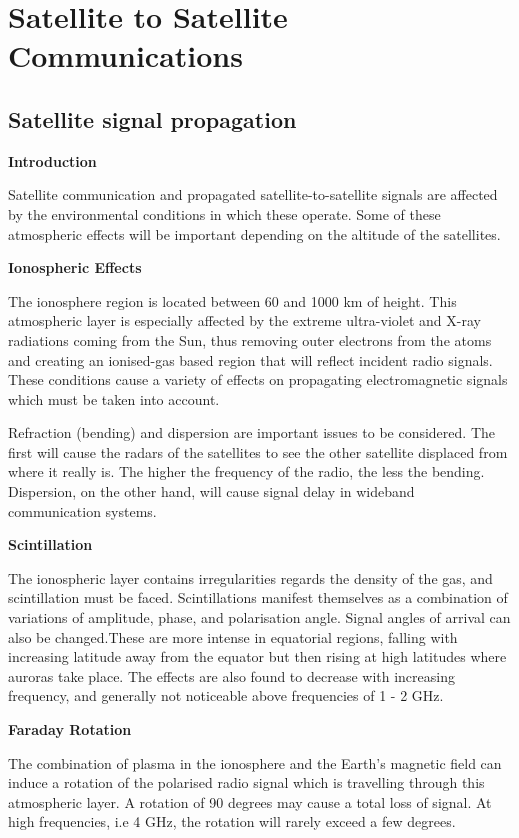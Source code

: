 \documentclass[12pt, titlepage]{article}
\begin{document}
\section{Satellite to Satellite Communications}


\subsection{Satellite signal propagation}

\textbf{Introduction}\newline

Satellite communication and propagated satellite-to-satellite signals are affected by the environmental conditions in which these operate. Some of these atmospheric effects will be important depending on the altitude of the satellites. \newline

\textbf{Ionospheric Effects}\newline

The ionosphere region is located between 60 and 1000 km of height. This atmospheric layer is especially affected by the extreme ultra-violet and X-ray radiations coming from the Sun, thus removing outer electrons from the atoms and creating an ionised-gas based region that will reflect incident radio signals. These conditions cause a variety of effects on propagating electromagnetic signals which must be taken into account. \newline

Refraction (bending) and dispersion are important issues to be considered. The first will cause the radars of the satellites to see the other satellite displaced from where it really is. The higher the frequency of the radio, the less the bending. Dispersion, on the other hand, will cause signal delay in wideband communication systems. \newline

\textbf{Scintillation}\newline

The ionospheric layer contains irregularities regards the density of the gas, and scintillation must be faced. Scintillations manifest themselves as a combination of variations of amplitude, phase, and polarisation angle. Signal angles of arrival can also be changed.These are more intense in equatorial regions, falling with increasing latitude away from the equator but then rising at high latitudes where auroras take place. The effects are also found to decrease with increasing frequency, and generally not noticeable above frequencies of 1 - 2 GHz.\newline

\textbf{Faraday Rotation}\newline

The combination of plasma in the ionosphere and the Earth's magnetic field can induce a rotation of the polarised radio signal which is travelling through this atmospheric layer. A rotation of 90 degrees may cause a total loss of signal. At high frequencies, i.e 4 GHz, the rotation will rarely exceed a few degrees. \newline

\pagebreak


\end{document}
